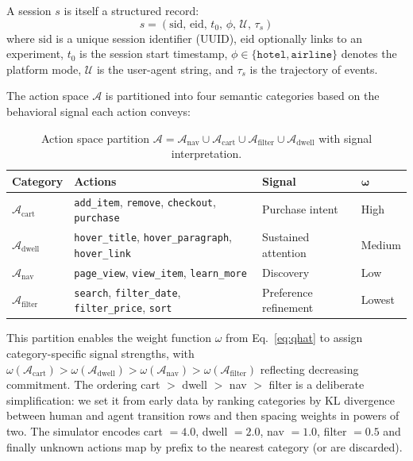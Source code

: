 A session $s$ is itself a structured record:
\begin{equation}
s = \left( \text{sid}, \, \text{eid}, \, t_0, \, \phi, \, \mathcal{U}, \, \tau_s \right)
\end{equation}
where $\text{sid}$ is a unique session identifier (UUID), $\text{eid}$ optionally links to an experiment, $t_0$ is the session start timestamp, $\phi \in \{\texttt{hotel}, \texttt{airline}\}$ denotes the platform mode, $\mathcal{U}$ is the user-agent string, and $\tau_s$ is the trajectory of events.

The action space $\mathcal{A}$ is partitioned into four semantic categories based on the behavioral signal each action conveys:

\begin{table}[ht]
\centering
\caption{Action space partition $\mathcal{A} = \mathcal{A}_{\text{nav}} \cup \mathcal{A}_{\text{cart}} \cup \mathcal{A}_{\text{filter}} \cup \mathcal{A}_{\text{dwell}}$ with signal interpretation.}
\label{tab:action_space}
\begin{tabular}{@{}llll@{}}
\toprule
\textbf{Category} & \textbf{Actions} & \textbf{Signal} & $\boldsymbol{\omega}$ \\
\midrule
$\mathcal{A}_{\text{cart}}$ & \texttt{add\_item}, \texttt{remove}, \texttt{checkout}, \texttt{purchase} & Purchase intent & High \\
$\mathcal{A}_{\text{dwell}}$ & \texttt{hover\_title}, \texttt{hover\_paragraph}, \texttt{hover\_link} & Sustained attention & Medium \\
$\mathcal{A}_{\text{nav}}$ & \texttt{page\_view}, \texttt{view\_item}, \texttt{learn\_more} & Discovery & Low \\
$\mathcal{A}_{\text{filter}}$ & \texttt{search}, \texttt{filter\_date}, \texttt{filter\_price}, \texttt{sort} & Preference refinement & Lowest \\
\bottomrule
\end{tabular}
\end{table}

This partition enables the weight function $\omega$ from Eq.~\ref{eq:qhat} to assign category-specific signal strengths, with $\omega(\mathcal{A}_{\text{cart}}) > \omega(\mathcal{A}_{\text{dwell}}) > \omega(\mathcal{A}_{\text{nav}}) > \omega(\mathcal{A}_{\text{filter}})$ reflecting decreasing commitment.
The ordering cart $>$ dwell $>$ nav $>$ filter is a deliberate simplification: we set it from early data by ranking categories by KL divergence between human and agent transition rows and then spacing weights in powers of two. The simulator encodes cart $=4.0$, dwell $=2.0$, nav $=1.0$, filter $=0.5$ and finally unknown actions map by prefix to the nearest category (or are discarded).

